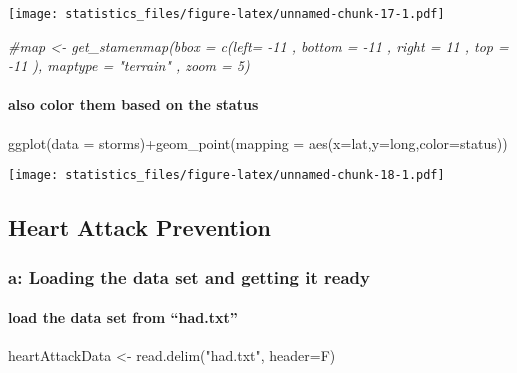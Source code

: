 \documentclass[
]{article}
\newenvironment{Shaded}{\begin{snugshade}}{\end{snugshade}}
\newcommand{\AttributeTok}[1]{\textcolor[rgb]{0.77,0.63,0.00}{#1}}
\newcommand{\CommentTok}[1]{\textcolor[rgb]{0.56,0.35,0.01}{\textit{#1}}}
\newcommand{\FunctionTok}[1]{\textcolor[rgb]{0.00,0.00,0.00}{#1}}
\newcommand{\NormalTok}[1]{#1}
\newcommand{\OtherTok}[1]{\textcolor[rgb]{0.56,0.35,0.01}{#1}}
\newcommand{\SpecialCharTok}[1]{\textcolor[rgb]{0.00,0.00,0.00}{#1}}
\newcommand{\StringTok}[1]{\textcolor[rgb]{0.31,0.60,0.02}{#1}}
\begin{document}
\texttt{[image: statistics\_files/figure-latex/unnamed-chunk-17-1.pdf]}

\begin{Shaded}
\begin{Highlighting}[]
\CommentTok{\#map \textless{}{-} get\_stamenmap(bbox = c(left= {-}11 , bottom = {-}11 , right = 11 , top = {-}11 ), maptype = "terrain" , zoom = 5)}
\end{Highlighting}
\end{Shaded}

\hypertarget{also-color-them-based-on-the-status}{%
\paragraph{also color them based on the
status}\label{also-color-them-based-on-the-status}}

\begin{Shaded}
\begin{Highlighting}[]
\FunctionTok{ggplot}\NormalTok{(}\AttributeTok{data =}\NormalTok{ storms)}\SpecialCharTok{+}\FunctionTok{geom\_point}\NormalTok{(}\AttributeTok{mapping =} \FunctionTok{aes}\NormalTok{(}\AttributeTok{x=}\NormalTok{lat,}\AttributeTok{y=}\NormalTok{long,}\AttributeTok{color=}\NormalTok{status))}
\end{Highlighting}
\end{Shaded}

\texttt{[image: statistics\_files/figure-latex/unnamed-chunk-18-1.pdf]}

\hypertarget{heart-attack-prevention}{%
\subsection{Heart Attack Prevention}\label{heart-attack-prevention}}

\hypertarget{a-loading-the-data-set-and-getting-it-ready}{%
\subsubsection{a: Loading the data set and getting it
ready}\label{a-loading-the-data-set-and-getting-it-ready}}

\hypertarget{load-the-data-set-from-had.txt}{%
\paragraph{load the data set from
``had.txt''}\label{load-the-data-set-from-had.txt}}

\begin{Shaded}
\begin{Highlighting}[]
\NormalTok{heartAttackData }\OtherTok{\textless{}{-}} \FunctionTok{read.delim}\NormalTok{(}\StringTok{"had.txt"}\NormalTok{, }\AttributeTok{header=}\NormalTok{F)}
\end{Highlighting}
\end{Shaded}
\end{document}
